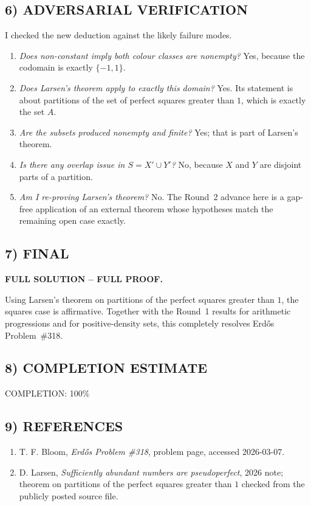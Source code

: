 \subsection*{6) ADVERSARIAL VERIFICATION}
I checked the new deduction against the likely failure modes.
\begin{enumerate}
\item \emph{Does non-constant imply both colour classes are nonempty?}  Yes, because the codomain is exactly $\{-1,1\}$.
\item \emph{Does Larsen's theorem apply to exactly this domain?}  Yes.  Its statement is about partitions of the set of perfect squares greater than $1$, which is exactly the set $A$.
\item \emph{Are the subsets produced nonempty and finite?}  Yes; that is part of Larsen's theorem.
\item \emph{Is there any overlap issue in $S=X'\cup Y'$?}  No, because $X$ and $Y$ are disjoint parts of a partition.
\item \emph{Am I re-proving Larsen's theorem?}  No.  The Round~2 advance here is a gap-free application of an external theorem whose hypotheses match the remaining open case exactly.
\end{enumerate}

\subsection*{7) FINAL}
\textbf{FULL SOLUTION -- FULL PROOF.}

Using Larsen's theorem on partitions of the perfect squares greater than $1$, the squares case is affirmative.  Together with the Round~1 results for arithmetic progressions and for positive-density sets, this completely resolves Erd\H{o}s Problem~\#318.

\subsection*{8) COMPLETION ESTIMATE}
COMPLETION: 100\%

\subsection*{9) REFERENCES}
\begin{enumerate}
\item T. F. Bloom, \emph{Erd\H{o}s Problem \#318}, problem page, accessed 2026-03-07.
\item D. Larsen, \emph{Sufficiently abundant numbers are pseudoperfect}, 2026 note; theorem on partitions of the perfect squares greater than $1$ checked from the publicly posted source file.
\end{enumerate}
